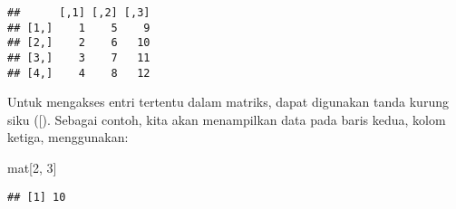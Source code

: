 \documentclass[
]{article}
\newenvironment{Shaded}{\begin{snugshade}}{\end{snugshade}}
\newcommand{\DecValTok}[1]{\textcolor[rgb]{0.00,0.00,0.81}{#1}}
\newcommand{\NormalTok}[1]{#1}
\begin{document}
\begin{verbatim}
##      [,1] [,2] [,3]
## [1,]    1    5    9
## [2,]    2    6   10
## [3,]    3    7   11
## [4,]    4    8   12
\end{verbatim}

Untuk mengakses entri tertentu dalam matriks, dapat digunakan tanda
kurung siku ({[}). Sebagai contoh, kita akan menampilkan data pada baris
kedua, kolom ketiga, menggunakan:

\begin{Shaded}
\begin{Highlighting}[]
\NormalTok{mat[}\DecValTok{2}\NormalTok{, }\DecValTok{3}\NormalTok{]}
\end{Highlighting}
\end{Shaded}

\begin{verbatim}
## [1] 10
\end{verbatim}
\end{document}
